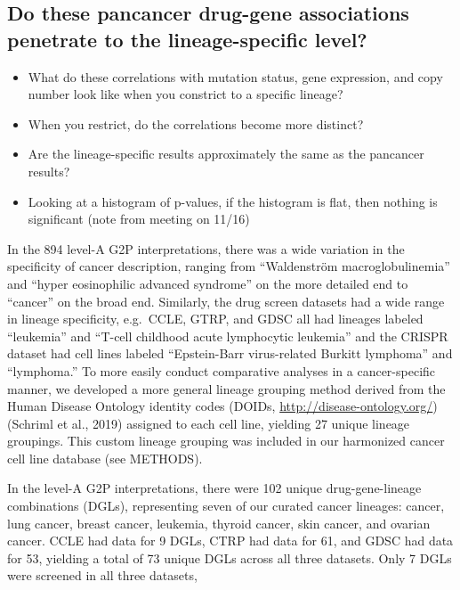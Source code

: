 \documentclass[man]{apa6}
\providecommand{\tightlist}{%
  \setlength{\itemsep}{0pt}\setlength{\parskip}{0pt}}
\begin{document}
\subsection{Do these pancancer drug-gene associations penetrate to the
lineage-specific
level?}\label{do-these-pancancer-drug-gene-associations-penetrate-to-the-lineage-specific-level}

\begin{itemize}
\tightlist
\item
  What do these correlations with mutation status, gene expression, and
  copy number look like when you constrict to a specific lineage?
\item
  When you restrict, do the correlations become more distinct?
\item
  Are the lineage-specific results approximately the same as the
  pancancer results?
\item
  Looking at a histogram of p-values, if the histogram is flat, then
  nothing is significant (note from meeting on 11/16)
\end{itemize}

In the 894 level-A G2P interpretations, there was a wide variation in
the specificity of cancer description, ranging from \enquote{Waldenström
macroglobulinemia} and \enquote{hyper eosinophilic advanced syndrome} on
the more detailed end to \enquote{cancer} on the broad end. Similarly,
the drug screen datasets had a wide range in lineage specificity,
e.g.~CCLE, GTRP, and GDSC all had lineages labeled \enquote{leukemia}
and \enquote{T-cell childhood acute lymphocytic leukemia} and the CRISPR
dataset had cell lines labeled \enquote{Epstein-Barr virus-related
Burkitt lymphoma} and \enquote{lymphoma.} To more easily conduct
comparative analyses in a cancer-specific manner, we developed a more
general lineage grouping method derived from the Human Disease Ontology
identity codes (DOIDs, \url{http://disease-ontology.org/}) (Schriml et
al., 2019) assigned to each cell line, yielding 27 unique lineage
groupings. This custom lineage grouping was included in our harmonized
cancer cell line database (see METHODS).

In the level-A G2P interpretations, there were 102 unique
drug-gene-lineage combinations (DGLs), representing seven of our curated
cancer lineages: cancer, lung cancer, breast cancer, leukemia, thyroid
cancer, skin cancer, and ovarian cancer. CCLE had data for 9 DGLs, CTRP
had data for 61, and GDSC had data for 53, yielding a total of 73 unique
DGLs across all three datasets. Only 7 DGLs were screened in all three
datasets,
\end{document}
